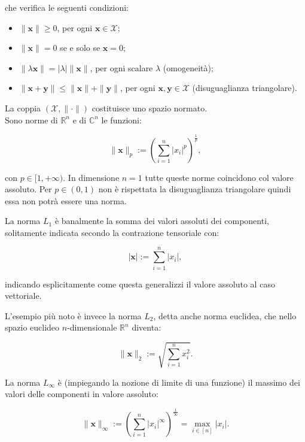 che verifica le seguenti condizioni:

\begin{itemize}
    \item $\|\mathbf{x}\| \geq 0$, per ogni $\mathbf{x} \in \mathcal{X}$;
    \item $\|\mathbf{x}\| = 0$ se e solo se $\mathbf{x} = 0$;
    \item $\|\lambda \mathbf{x}\| = |\lambda| \|\mathbf{x}\|$, per ogni scalare $\lambda$ (omogeneità);
    \item $\|\mathbf{x} + \mathbf{y}\| \leq \|\mathbf{x}\| + \|\mathbf{y}\|$, per ogni $\mathbf{x}, \mathbf{y} \in \mathcal{X}$ (disuguaglianza triangolare).
\end{itemize}

La coppia $(\mathcal{X}, \|\cdot\|)$ costituisce uno spazio normato.\\

Sono norme di $\mathbb{R}^n$ e di $\mathbb{C}^n$ le funzioni:

\[
\|\mathbf{x}\|_p := \left(\sum_{i=1}^{n} |x_i|^p \right)^{\frac{1}{p}},
\]

con $p \in [1, +\infty)$. In dimensione $n=1$ tutte queste norme coincidono col valore assoluto. Per $p \in (0, 1)$ non è rispettata la disuguaglianza triangolare quindi essa non potrà essere una norma.

La norma $L_1$ è banalmente la somma dei valori assoluti dei componenti, solitamente indicata secondo la contrazione tensoriale con:

\[
|\mathbf{x}| := \sum_{i=1}^{n} |x_i|,
\]

indicando esplicitamente come questa generalizzi il valore assoluto al caso vettoriale.

L'esempio più noto è invece la norma $L_2$, detta anche norma euclidea, che nello spazio euclideo $n$-dimensionale $\mathbb{R}^n$ diventa:

\[
\|\mathbf{x}\|_2 := \sqrt{\sum_{i=1}^{n} x_i^2}.
\]

La norma $L_\infty$ è (impiegando la nozione di limite di una funzione) il massimo dei valori delle componenti in valore assoluto:

\[
\|\mathbf{x}\|_\infty := \left(\sum_{i=1}^{n} |x_i|^\infty \right)^{\frac{1}{\infty}} = \max_{i \in [n]} |x_i|.
\]


